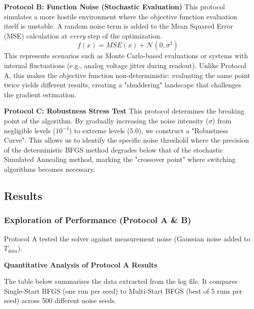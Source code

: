 \textbf{Protocol B: Function Noise (Stochastic Evaluation)}
This protocol simulates a more hostile environment where the objective function evaluation itself is unstable. A random noise term is added to the Mean Squared Error (MSE) calculation at \textit{every} step of the optimization.
\begin{equation}
f(x) = MSE(x) + \mathcal{N}(0, \sigma^2)
\end{equation}
This represents scenarios such as Monte Carlo-based evaluations or systems with internal fluctuations (e.g., analog voltage jitter during readout). Unlike Protocol A, this makes the objective function non-deterministic: evaluating the same point twice yields different results, creating a "shuddering" landscape that challenges the gradient estimation.

\textbf{Protocol C: Robustness Stress Test}
This protocol determines the breaking point of the algorithm. By gradually increasing the noise intensity ($\sigma$) from negligible levels ($10^{-4}$) to extreme levels ($5.0$), we construct a "Robustness Curve". This allows us to identify the specific noise threshold where the precision of the deterministic BFGS method degrades below that of the stochastic Simulated Annealing method, marking the "crossover point" where switching algorithms becomes necessary.

\subsection{Results}

\subsubsection{Exploration of Performance (Protocol A \& B)}
Protocol A tested the solver against measurement noise (Gaussian noise added to $T_{data}$).

\textbf{Quantitative Analysis of Protocol A Results}

The table below summarises the data extracted from the log file. It compares Single-Start BFGS (one run per seed) to Multi-Start BFGS (best of 5 runs per seed) across 500 different noise seeds.


